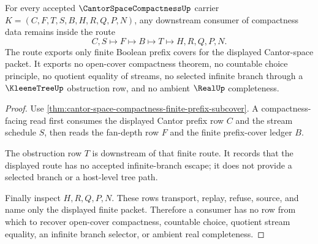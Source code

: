 \begin{theorem}
\label{thm:cantor-space-compactness-nonescape}
For every accepted $\CantorSpaceCompactnessUp$ carrier $K=(C,F,T,S,B,H,R,Q,P,N)$, any downstream consumer of compactness data remains inside the route
$$
C,S \longmapsto F \longmapsto B \longmapsto T \longmapsto H,R,Q,P,N .
$$
The route exports only finite Boolean prefix covers for the displayed Cantor-space packet. It exports no open-cover compactness theorem, no countable choice principle, no quotient equality of streams, no selected infinite branch through a $\KleeneTreeUp$ obstruction row, and no ambient $\RealUp$ completeness.
\end{theorem}
\begin{proof}
Use \autoref{thm:cantor-space-compactness-finite-prefix-subcover}. A compactness-facing read first consumes the displayed Cantor prefix row $C$ and the stream schedule $S$, then reads the fan-depth row $F$ and the finite prefix-cover ledger $B$.

The obstruction row $T$ is downstream of that finite route. It records that the displayed route has no accepted infinite-branch escape; it does not provide a selected branch or a host-level tree path.

Finally inspect $H,R,Q,P,N$. These rows transport, replay, refuse, source, and name only the displayed finite packet. Therefore a consumer has no row from which to recover open-cover compactness, countable choice, quotient stream equality, an infinite branch selector, or ambient real completeness.
\end{proof}




